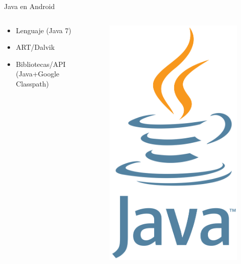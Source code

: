 \documentclass[aspectratio=169]{beamer}
\begin{document}
\begin{frame}[fragile]{Java en Android}
    
    \begin{columns}
        \begin{column}{0.5\textwidth}
            \begin{itemize}
                \item Lenguaje (Java 7)
                \item ART/Dalvik
                \item Bibliotecas/API (Java+Google Classpath)
            \end{itemize}
        \end{column}
        \begin{column}{0.5\textwidth}  %
            \begin{figure}
                \centering
                \includegraphics[width=0.4\linewidth]{Images/java}
            \end{figure}
        \end{column}
    \end{columns}
    
    
\end{frame}
\end{document}
